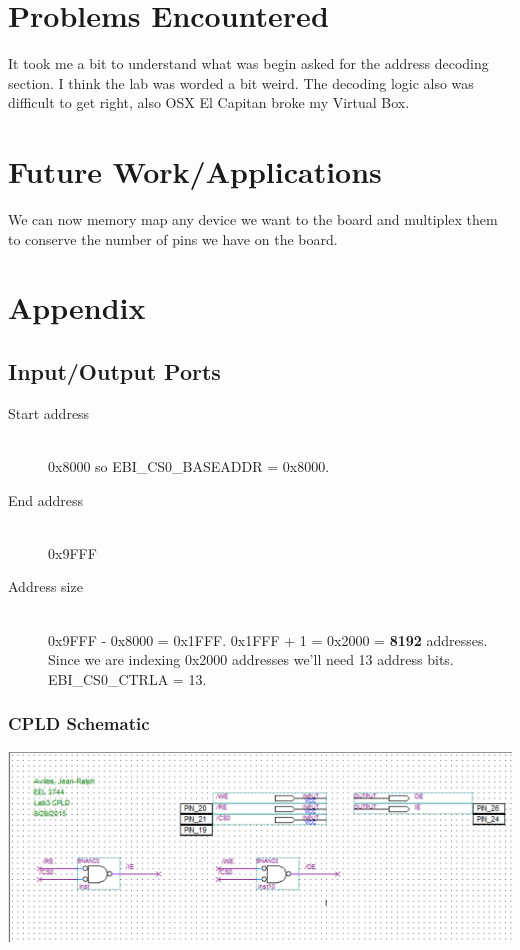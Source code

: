 \documentclass[letterpaper, 12pt]{article}
\begin{document}
\section*{Problems Encountered}
It took me a bit to understand what was begin asked for the address decoding section. I think the lab was worded a bit weird. The decoding logic also was difficult to get right, also OSX El Capitan broke my Virtual Box.
\section*{Future Work/Applications}
We can now memory map any device we want to the board and multiplex them to conserve the number of pins we have on the board.
\section*{Appendix}
\subsection*{Input/Output Ports}
\begin{description}
\item [Start address] \hfill \\
\hspace*{8pt} 0x8000 so EBI\_CS0\_BASEADDR = 0x8000.
\item [End address] \hfill \\
\hspace*{8pt} 0x9FFF
\item [Address size] \hfill \\
  \hspace*{8pt} 0x9FFF - 0x8000 = 0x1FFF. 0x1FFF + 1 = 0x2000 = \textbf{8192}
  addresses. Since we are indexing 0x2000 addresses we'll need 13 address bits. \\
  EBI\_CS0\_CTRLA = 13.
\end{description}
\subsubsection*{CPLD Schematic}
\includegraphics[width=1.0\textwidth,keepaspectratio=true]{CPLD}
\end{document}
